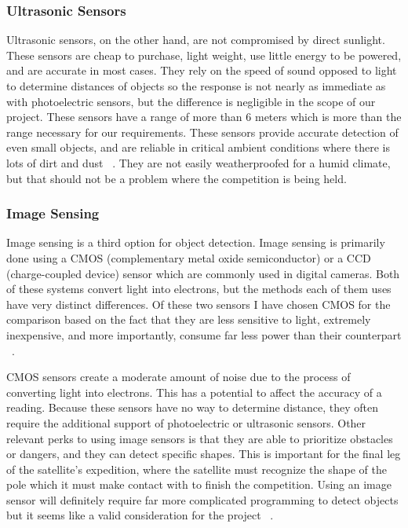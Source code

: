 \documentclass[10pt,letterpaper,onecolumn,journal]{IEEEtran}
\begin{document}
\subsubsection{Ultrasonic Sensors}
Ultrasonic sensors, on the other hand, are not compromised by direct sunlight. These sensors are cheap to purchase, light weight, use little energy to be powered, and are accurate in most cases. They rely on the speed of sound opposed to light to determine distances of objects so the response is not nearly as immediate as with photoelectric sensors, but the difference is negligible in the scope of our project. These sensors have a range of more than 6 meters which is more than the range necessary for our requirements. These sensors provide accurate detection of even small objects, and are reliable in critical ambient conditions where there is lots of dirt and dust ~\cite{gmbh2016}. They are not easily weatherproofed for a humid climate, but that should not be a problem where the competition is being held.
\subsubsection{Image Sensing}
Image sensing is a third option for object detection. Image sensing is primarily done using a CMOS (complementary metal oxide semiconductor) or a CCD (charge-coupled device) sensor which are commonly used in digital cameras. Both of these systems convert light into electrons, but the methods each of them uses have very distinct differences. Of these two sensors I have chosen CMOS for the comparison based on the fact that they are less sensitive to light, extremely inexpensive, and more importantly, consume far less power than their counterpart ~\cite{howstuffworks2000}.\vspace{.3cm}
\par
CMOS sensors create a moderate amount of noise due to the process of converting light into electrons. This has a potential to affect the accuracy of a reading. Because these sensors have no way to determine distance, they often require the additional support of photoelectric or ultrasonic sensors. Other relevant perks to using image sensors is that they are able to prioritize obstacles or dangers, and they can detect specific shapes. This is important for the final leg of the satellite’s expedition, where the satellite must recognize the shape of the pole which it must make contact with to finish the competition. Using an image sensor will definitely require far more complicated programming to detect objects but it seems like a valid consideration for the project ~\cite{robotics2013}.
\end{document}
